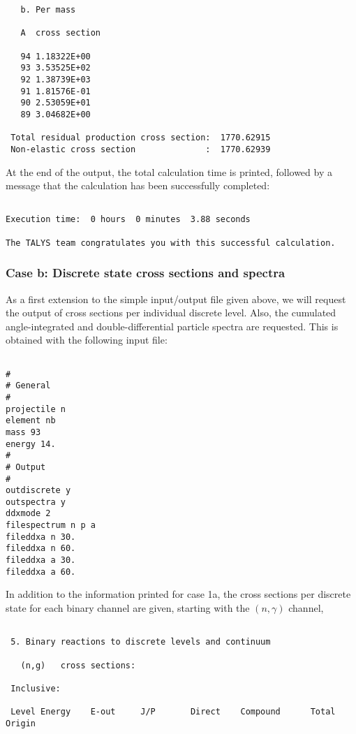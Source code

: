 \begin{samplecase}
{\begin{verbatim}
   b. Per mass

   A  cross section

   94 1.18322E+00
   93 3.53525E+02
   92 1.38739E+03
   91 1.81576E-01
   90 2.53059E+01
   89 3.04682E+00

 Total residual production cross section:  1770.62915
 Non-elastic cross section              :  1770.62939
\end{verbatim} } \renewcommand{\baselinestretch}{1.07}\small\normalsize
\noindent
At the end of the output, the total calculation time is printed, followed by a 
message that the calculation has been successfully completed:

{\small \begin{verbatim}

Execution time:  0 hours  0 minutes  3.88 seconds

The TALYS team congratulates you with this successful calculation.
\end{verbatim} } \renewcommand{\baselinestretch}{1.07}\small\normalsize
\subsubsection{Case b: Discrete state cross sections and spectra}
As a first extension to the simple input/output file given above, we will 
request the 
output of cross sections per individual discrete level.
Also, the cumulated angle-integrated and double-differential 
particle spectra are requested. This is obtained with the following input file:

{\small \begin{verbatim}

#
# General
#
projectile n
element nb
mass 93
energy 14.
#
# Output
#
outdiscrete y
outspectra y
ddxmode 2
filespectrum n p a
fileddxa n 30.
fileddxa n 60.
fileddxa a 30.          
fileddxa a 60.          
\end{verbatim} } \renewcommand{\baselinestretch}{1.07}\small\normalsize
\noindent
In addition to the information printed for case 1a, the cross 
sections per discrete state for each binary channel are given, starting with the
$(n,\gamma )$ channel,

{\small \begin{verbatim}

 5. Binary reactions to discrete levels and continuum

   (n,g)   cross sections:

 Inclusive:

 Level Energy    E-out     J/P       Direct    Compound      Total     Origin


\end{verbatim}}
\end{samplecase}
